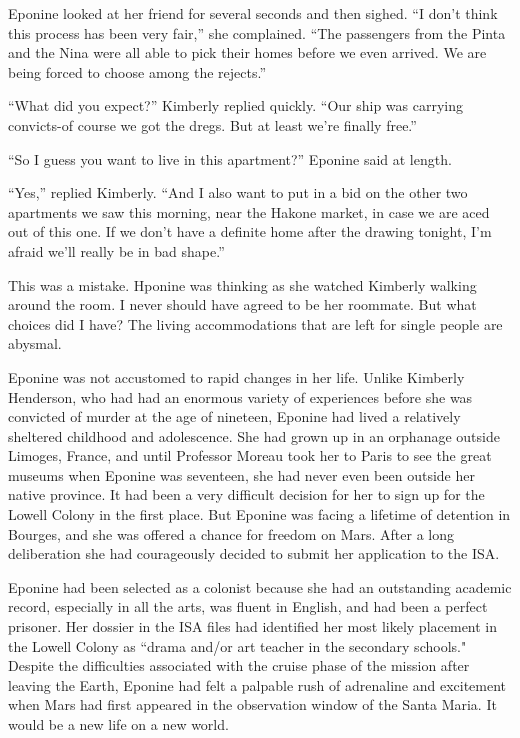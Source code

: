 \documentclass[]{article}
\begin{document}
{Eponine looked at her friend for several seconds and then sighed.  “I don’t think this process has been very fair,” she complained.  “The passengers from the Pinta and the Nina were all able to pick their homes before we even arrived.  We are being forced to choose among the rejects.”

“What did you expect?” Kimberly replied quickly.  “Our ship was carrying convicts-of course we got the dregs.  But at least we’re finally free.”

“So I guess you want to live in this apartment?” Eponine said at length.

“Yes,” replied Kimberly.  “And I also want to put in a bid on the other two apartments we saw this morning, near the Hakone market, in case we are aced out of this one.  If we don’t have a definite home after the drawing tonight, I’m afraid we’ll really be in bad shape.”

This was a mistake.  Hponine was thinking as she watched Kimberly walking around the room.  I never should have agreed to be her roommate.  But what choices did I have? The living accommodations that are left for single people are abysmal.

Eponine was not accustomed to rapid changes in her life.  Unlike Kimberly Henderson, who had had an enormous variety of experiences before she was convicted of murder at the age of nineteen, Eponine had lived a relatively sheltered childhood and adolescence.  She had grown up in an orphanage outside Limoges, France, and until Professor Moreau took her to Paris to see the great museums when Eponine was seventeen, she had never even been outside her native province.  It had been a very difficult decision for her to sign up for the Lowell Colony in the first place.  But Eponine was facing a lifetime of detention in Bourges, and she was offered a chance for freedom on Mars.  After a long deliberation she had courageously decided to submit her application to the ISA.

Eponine had been selected as a colonist because she had an outstanding academic record, especially in all the arts, was fluent in English, and had been a perfect prisoner.  Her dossier in the ISA files had identified her most likely placement in the Lowell Colony as “drama and/or art teacher in the secondary schools."  Despite the difficulties associated with the cruise phase of the mission after leaving the Earth, Eponine had felt a palpable rush of adrenaline and excitement when Mars had first appeared in the observation window of the Santa Maria.  It would be a new life on a new world.

}
\end{document}
